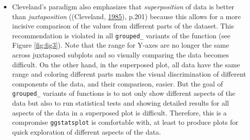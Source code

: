 \documentclass[
]{article}
\providecommand{\tightlist}{%
  \setlength{\itemsep}{0pt}\setlength{\parskip}{0pt}}
\begin{document}
\begin{itemize}
\tightlist
\item
  Cleveland's paradigm also emphasizes that \emph{superposition} of data is better
  than \emph{juxtaposition} ((Cleveland, \protect\hyperlink{ref-clevelandElementsGraphingData1985}{1985}), p.201) because
  this allows for a more incisive comparison of the values from different
  parts of the dataset. This recommendation is violated in all \texttt{grouped\_}
  variants of the function (see Figure \ref{fig:fig3}). Note that the range
  for Y-axes are no longer the same across juxtaposed subplots and so visually
  comparing the data becomes difficult. On the other hand, in the superposed
  plot, all data have the same range and coloring different parts makes the
  visual discrimination of different components of the data, and their
  comparison, easier. But the goal of \texttt{grouped\_} variants of functions is to
  not only show different aspects of the data but also to run statistical
  tests and showing detailed results for all aspects of the data in a
  superposed plot is difficult. Therefore, this is a compromise \texttt{ggstatsplot}
  is comfortable with, at least to produce plots for quick exploration of
  different aspects of the data.
\end{itemize}
\end{document}
